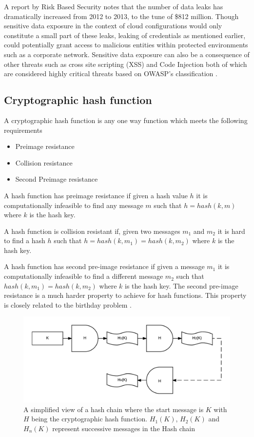 \documentclass[a4paper,twoside]{article}
\begin{document}
A report by Risk Based Security \cite{risk_based_executives_2014} \cite{shu_privacy-preserving_2015} notes that the number of data leaks has dramatically increased from 2012 to 2013, to the tune of \$812 million. Though sensitive data exposure in the context of cloud configurations would only constitute a small part of these leaks, leaking of credentials as mentioned earlier, could potentially grant access to malicious entities within protected environments such as a corporate network. Sensitive data exposure can also be a consequence of other threats such as cross site scripting (XSS) \cite{louw_blueprint:_2009} and Code Injection both of which are considered highly critical threats based on OWASP's classification \cite{wichers_owasp_2014}. 

\subsection{Cryptographic hash function } 
 A cryptographic hash function is any one way function which meets the following requirements \cite{rogaway_cryptographic_2004} 
 \begin{itemize} 
 \item Preimage resistance
 \item Collision resistance
 \item Second Preimage resistance
 \end{itemize}
 
 A hash function has preimage resistance if given a hash value $h$ it is computationally infeasible to find any message $m$ such that $h = hash(k,m)$ where $k$ is the hash key.
 
 A hash function is collision resistant if, given two messages $m_{1}$ and $m_{2}$ it is hard to find a hash $h$ such that $h = hash(k,m_{1}) = hash(k,m_{2})$ where $k$ is the hash key.
 
 A hash function has second pre-image resistance if given a message $m_{1}$ it is computationally infeasible to find a different message  $m_{2}$ such that $hash(k,m_{1}) = hash(k,m_{2})$ where $k$ is the hash key. The second pre-image resistance is a much harder property to achieve for hash functions. This property is closely related to the birthday problem \cite{lesser_exploring_1999}.
 
 \begin{figure}[hbtp]
 \includegraphics[scale=0.55]{hash_function.png}
 \caption{A simplified view of a hash chain where the start message is $K$ with $H$ being the cryptographic hash function. $H_1(K)$, $H_2(K)$ and $H_n(K)$ represent successive messages in the Hash chain  }
 \label{fig:hashchain}
 \end{figure}
\end{document}
